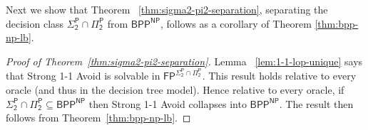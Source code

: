 
Next we show that Theorem ~\ref{thm:sigma2-pi2-separation}, separating the decision class $\mathsf{\Sigma_2^P \cap \Pi_2^P}$ from $\mathsf{BPP^{NP}}$, follows as a corollary of Theorem \ref{thm:bpp-np-lb}.



\begin{proof}[Proof of Theorem~\ref{thm:sigma2-pi2-separation}]
Lemma ~\ref{lem:1-1-lop-unique} says that {\sc Strong 1-1 Avoid} is solvable in $\mathsf{FP^{\Sigma_2^P \cap \Pi_2^P}}$. This result holds relative to every oracle (and thus in the decision tree model). Hence relative to every oracle, if $\mathsf{\Sigma_2^P} \cap \mathsf{\Pi_2^P} \subseteq \mathsf{BPP^{NP}}$ then {\sc Strong 1-1 Avoid} collapses into $\mathsf{BPP^{NP}}$. The result then follows from Theorem~\ref{thm:bpp-np-lb}.
\end{proof}




